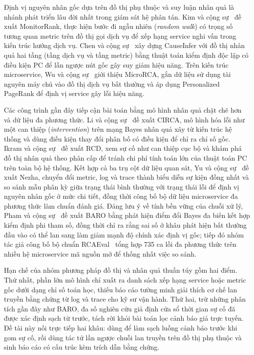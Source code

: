 Định vị nguyên nhân gốc dựa trên đồ thị phụ thuộc và suy luận nhân quả là nhánh phát triển lâu đời nhất trong giám sát hệ phân tán. Kim và cộng sự~\cite{kim2013monitorrank} đề xuất MonitorRank, thực hiện bước đi ngẫu nhiên (\emph{random walk}) có trọng số tương quan metric trên đồ thị gọi dịch vụ để xếp hạng service nghi vấn trong kiến trúc hướng dịch vụ. Chen và cộng sự~\cite{chen2014causeinfer} xây dựng CauseInfer với đồ thị nhân quả hai tầng (tầng dịch vụ và tầng metric) bằng thuật toán kiểm định độc lập có điều kiện PC để lần ngược nút gốc gây suy giảm hiệu năng. Trên kiến trúc microservice, Wu và cộng sự~\cite{wu2020microrca} giới thiệu MicroRCA, gắn dữ liệu sử dụng tài nguyên máy chủ vào đồ thị dịch vụ bất thường và áp dụng Personalized PageRank để định vị service gây lỗi hiệu năng.

Các công trình gần đây tiếp cận bài toán bằng mô hình nhân quả chặt chẽ hơn và dữ liệu đa phương thức. Li và cộng sự~\cite{li2022circa} đề xuất CIRCA, mô hình hóa lỗi như một can thiệp (\emph{intervention}) trên mạng Bayes nhân quả xây từ kiến trúc hệ thống và dùng điều kiện thay đổi phân bố có điều kiện để chỉ ra chỉ số gốc. Ikram và cộng sự~\cite{ikram2022rcd} đề xuất RCD, xem sự cố như can thiệp cục bộ và khám phá đồ thị nhân quả theo phân cấp để tránh chi phí tính toán lớn của thuật toán PC trên toàn bộ hệ thống. Kết hợp cả ba trụ cột dữ liệu quan sát, Yu và cộng sự~\cite{nezha} đề xuất Nezha, chuyển đổi metric, log và trace thành biểu diễn sự kiện đồng nhất và so sánh mẫu phân kỳ giữa trạng thái bình thường với trạng thái lỗi để định vị nguyên nhân gốc ở mức chi tiết, đồng thời công bố bộ dữ liệu microservice đa phương thức làm chuẩn đánh giá. Đáng lưu ý về tính bền vững của chuỗi xử lý, Pham và cộng sự~\cite{pham2024baro} đề xuất BARO bằng phát hiện điểm đổi Bayes đa biến kết hợp kiểm định phi tham số, đồng thời chỉ ra rằng sai số ở khâu phát hiện bất thường đầu vào có thể lan sang làm giảm mạnh độ chính xác định vị gốc; tiếp đó nhóm tác giả công bố bộ chuẩn RCAEval~\cite{pham2025rcaeval} tổng hợp 735 ca lỗi đa phương thức trên nhiều hệ microservice mã nguồn mở để thống nhất việc so sánh.

Hạn chế của nhóm phương pháp đồ thị và nhân quả thuần túy gồm hai điểm. Thứ nhất, phần lớn mô hình chỉ xuất ra danh sách xếp hạng service hoặc metric gốc dưới dạng chỉ số toán học, thiếu báo cáo tường minh giải thích cơ chế lan truyền bằng chứng từ log và trace cho kỹ sư vận hành. Thứ hai, trừ những phân tích gần đây như BARO, đa số nghiên cứu  giả định cửa sổ thời gian sự cố đã được xác định sạch từ trước, tách rời khỏi bài toán lọc cảnh báo giả trực tuyến. Đề tài này nối trực tiếp hai khâu: dùng \CTAV{} để làm sạch luồng cảnh báo trước khi gom sự cố, rồi dùng tác tử  lần ngược chuỗi lan truyền trên đồ thị phụ thuộc và sinh báo cáo có cấu trúc kèm trích dẫn bằng chứng.

